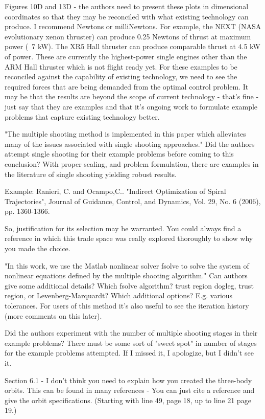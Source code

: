 \documentclass[11pt]{article}
\begin{document}
\begin{enumerate}
Figures 10D and 13D - the authors need to present these plots in dimensional coordinates so that they may be reconciled with what existing technology can produce.  I recommend Newtons or milliNewtons.  For example, the NEXT (NASA evolutionary xenon thruster) can produce 0.25 Newtons of thrust at maximum power (~7 kW).  The XR5 Hall thruster can produce comparable thrust at 4.5 kW of power.  These are currently the highest-power single engines other than the ARM Hall thruster which is not flight ready yet.  For these examples to be reconciled against the capability of existing technology, we need to see the required forces that are being demanded from the optimal control problem.  It may be that the results are beyond the scope of current technology - that's fine - just say that they are examples and that it's ongoing work to formulate example problems that capture existing technology better.

"The multiple shooting method is implemented in this paper which alleviates many of the issues associated with single shooting approaches."  Did the authors attempt single shooting for their example problems before coming to this conclusion?  With proper scaling, and problem formulation, there are examples in the literature of single shooting yielding robust results.  

Example: 
Ranieri, C. and Ocampo,C..  "Indirect Optimization of Spiral Trajectories", Journal of Guidance, Control, and Dynamics, Vol. 29, No. 6 (2006), pp. 1360-1366.

So, justification for its selection may be warranted.  You could always find a reference in which this trade space was really explored thoroughly to show why you made the choice.

"In this work, we use the Matlab nonlinear solver fsolve to solve the system of nonlinear equations defined by the multiple shooting algorithm."  Can authors give some additional details?  Which fsolve algorithm? trust region dogleg,  trust region, or Levenberg-Marquardt?  Which additional options?  E.g. various tolerances.  For users of this method it's also useful to see the iteration history (more comments on this later).

Did the authors experiment with the number of multiple shooting stages in their example problems?  There must be some sort of "sweet spot" in number of stages for the example problems attempted.  If I missed it, I apologize, but I didn't see it.

Section 6.1 - I don't think you need to explain how you created the three-body orbits.  This can be found in many references - You can just cite a reference and give the orbit specifications.  (Starting with line 49, page 18, up to line 21 page 19.)


\end{enumerate}
\end{document}

